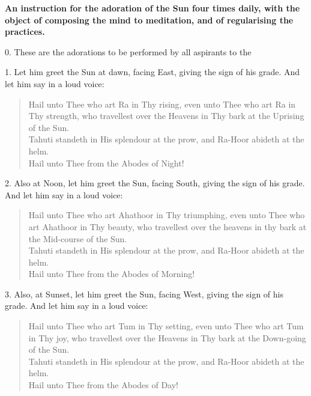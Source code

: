 
\textbf{An instruction for the adoration of the Sun four times daily, with the object of composing the mind to meditation, and of regularising the practices.}

0. These are the adorations to be performed by all aspirants to the \Argentium{}

1. Let him greet the Sun at dawn, facing East, giving the sign of his grade. And let him say in a loud voice:

\begin{verse}
Hail unto Thee who art Ra in Thy rising, even unto Thee who art Ra in Thy strength, who travellest over the Heavens in Thy bark at the Uprising of the Sun.  \\
Tahuti standeth in His splendour at the prow, and Ra-Hoor abideth at the helm. \\
Hail unto Thee from the Abodes of Night!
\end{verse}

2. Also at Noon, let him greet the Sun, facing South, giving the sign of his grade. And let him say in a loud voice:

\begin{verse}
Hail unto Thee who art Ahathoor in Thy triumphing, even unto Thee who art Ahathoor in Thy beauty, who travellest over the heavens in thy bark at the Mid-course of the Sun. \\
Tahuti standeth in His splendour at the prow, and Ra-Hoor abideth at the helm. \\
Hail unto Thee from the Abodes of Morning!
\end{verse}

3. Also, at Sunset, let him greet the Sun, facing West, giving the sign of his grade. And let him say in a loud voice:
\begin{verse}
Hail unto Thee who art Tum in Thy setting, even unto Thee who art Tum in Thy joy, who travellest over the Heavens in Thy bark at the Down-going of the Sun. \\
Tahuti standeth in His splendour at the prow, and Ra-Hoor abideth at the helm. \\
Hail unto Thee from the Abodes of Day!
\end{verse}

